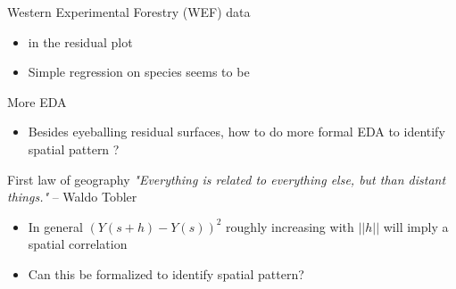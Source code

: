 \begin{frame}{Western Experimental Forestry (WEF) data}
\begin{figure}
\begin{center}
	\end{center}
\end{figure}
\pause
\begin{itemize}
	\item {} in the residual plot
	\item Simple regression on species seems to be 
\end{itemize}
\end{frame}



\begin{frame}{More EDA}
	\begin{itemize}
		\item Besides eyeballing residual surfaces, how to do more formal EDA to identify spatial pattern ?
	\end{itemize}
	\pause
      \begin{exampleblock}{First law of geography}
{\em "Everything is related to everything else, but  than distant things."} -- Waldo Tobler
		\end{exampleblock}
	
	\pause
	\begin{itemize}
		\item In general $(Y(s+h)-Y(s))^2$ roughly increasing with $||h||$ will imply a spatial correlation
		\item Can this be formalized to identify spatial pattern?
	\end{itemize}
\end{frame}

